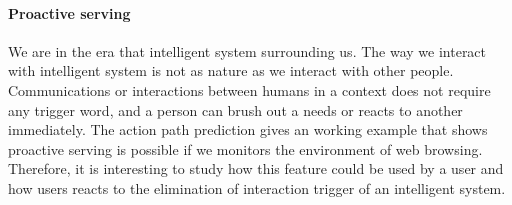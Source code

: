 \paragraph{Proactive serving} 
We are in the era that intelligent system surrounding us. The way we interact with intelligent system
is not as nature as we interact with other people. 
Communications or interactions between humans in a context does not require any trigger word,
and a person can brush out a needs or reacts to another immediately.
The action path prediction gives an working example that shows proactive serving is possible
if we monitors the environment of web browsing. Therefore, it is interesting to study
how this feature could be used by a user and how users reacts to the elimination of interaction trigger
of an intelligent system.

\cleardoublepage